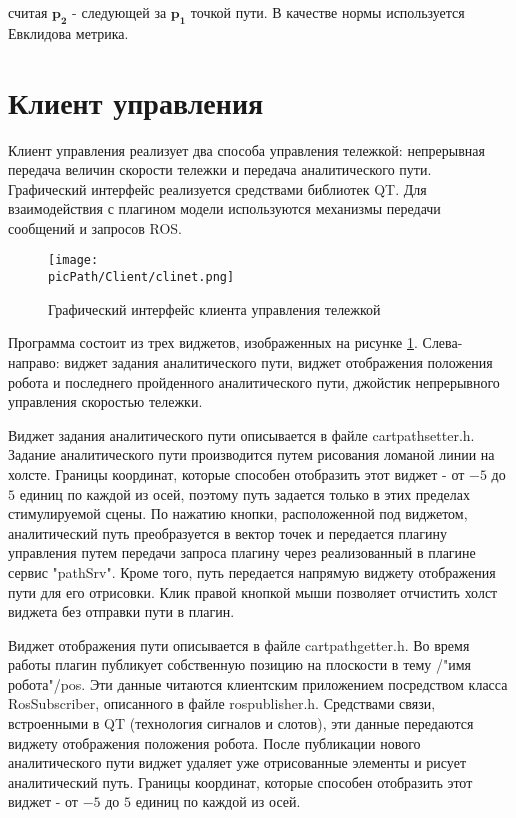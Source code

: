 \documentclass[oneside,final,14pt]{extreport}
\newcommand{\picPath}{img}
\newcommand{\bs}{\boldsymbol}
\begin{document}
считая $\bs{p_2}$ - следующей за $\bs{p_1}$ точкой пути. В качестве нормы используется Евклидова метрика.
\section{ Клиент управления } 

Клиент управления реализует два способа управления тележкой: непрерывная передача величин скорости тележки и передача аналитического пути. Графический интерфейс реализуется средствами библиотек QT. Для взаимодействия с плагином модели используются механизмы передачи сообщений и запросов ROS.

\begin{figure}[H]
\begin{center}
\texttt{[image: \\picPath/Client/clinet.png]}
\end{center}
  \caption{ Графический интерфейс клиента управления тележкой }
  \label{Figure:client}
\end{figure}

Программа состоит из трех виджетов, изображенных на рисунке \ref{Figure:client}. Слева-направо: виджет задания аналитического пути, виджет отображения положения робота и последнего пройденного аналитического пути, джойстик непрерывного управления скоростью тележки.   

Виджет задания аналитического пути описывается в файле cartpathsetter.h. 
Задание аналитического пути производится путем рисования ломаной линии на холсте. Границы координат, которые способен отобразить этот виджет -  от $-5$ до $5$ единиц по каждой из осей, поэтому путь задается только в этих пределах стимулируемой сцены. По нажатию кнопки, расположенной под виджетом, аналитический путь преобразуется в вектор точек и передается плагину управления путем передачи
запроса плагину через реализованный в плагине сервис "pathSrv". 
Кроме того, путь передается напрямую виджету отображения пути для его отрисовки. Клик правой кнопкой мыши позволяет отчистить холст виджета без отправки пути в плагин.

Виджет отображения пути описывается в файле cartpathgetter.h. Во время работы плагин публикует собственную позицию на плоскости в тему /"имя робота"/pos.  Эти данные читаются клиентским приложением посредством класса RosSubscriber, описанного в файле rospublisher.h. Средствами связи, встроенными в QT (технология сигналов и слотов), эти данные передаются виджету отображения положения робота. После публикации нового аналитического пути виджет удаляет уже отрисованные элементы и рисует аналитический путь. Границы координат, которые способен отобразить этот виджет - от $-5$ до $5$ единиц по каждой из осей. 
\end{document}
